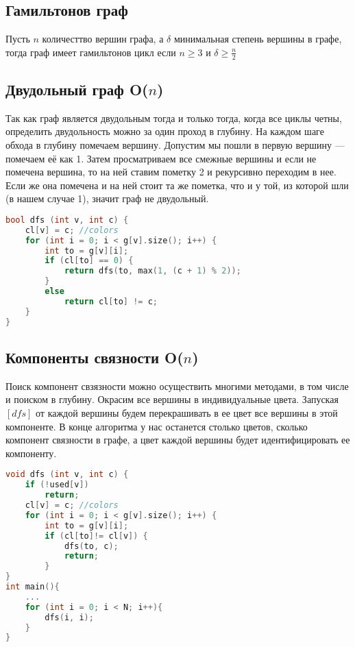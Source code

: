 \subsection{Гамильтонов граф}
Пусть ${n}$ количесттво вершин графа, а ${\delta}$ минимальная степень вершины в графе, тогда граф имеет гамильтонов цикл если ${n\geq 3}$ и ${\delta \geq \frac{n}{2}}$
\subsection{Двудольный граф O($n$)}
Так как граф является двудольным тогда и только тогда, когда все циклы четны, определить двудольность можно за один проход в глубину. На каждом шаге обхода в глубину помечаем вершину. Допустим мы пошли в первую вершину — помечаем её как 1. Затем просматриваем все смежные вершины и если не помечена вершина, то на ней ставим пометку 2 и рекурсивно переходим в нее. Если же она помечена и на ней стоит та же пометка, что и у той, из которой шли (в нашем случае 1), значит граф не двудольный.
\begin{lstlisting}[language=C++]
bool dfs (int v, int c) {
	cl[v] = c; //colors
	for (int i = 0; i < g[v].size(); i++) {
		int to = g[v][i];
		if (cl[to] == 0) {
		    return dfs(to, max(1, (c + 1) % 2));
		}
		else 
		    return cl[to] != c;
	}
}
\end{lstlisting}
\subsection{Компоненты связности O($n$)}
Поиск компонент свзязности можно осуществить многими методами, в том числе и поиском в глубину. Окрасим все вершины в индивидуальные цвета. Запуская $[dfs]$ от каждой вершины будем перекрашивать в ее цвет все вершины в этой компоненте. В конце алгоритма у нас останется столько цветов, сколько компонент связности в графе, а цвет каждой вершины будет идентифицировать ее компоненту.
\begin{lstlisting}[language=C++]
void dfs (int v, int c) {
    if (!used[v])
        return;
	cl[v] = c; //colors
	for (int i = 0; i < g[v].size(); i++) {
		int to = g[v][i];
		if (cl[to]!= cl[v]) {
		    dfs(to, c);
		    return;
		}
}
int main(){
    ...
    for (int i = 0; i < N; i++){
        dfs(i, i);
    }
}
\end{lstlisting}
